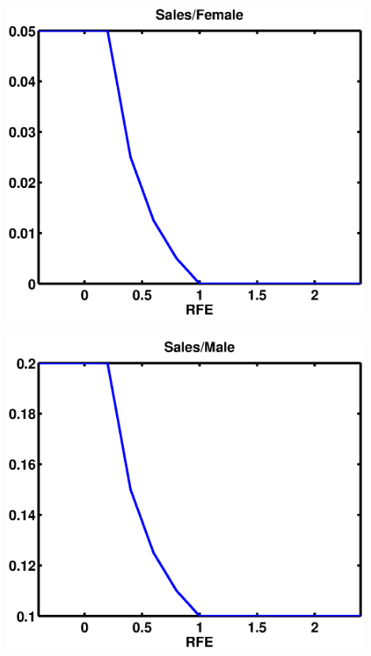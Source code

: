 \documentclass[mathserif]{beamer}
\begin{document}
\begin{frame}
\begin{center}
\frametitle{\insertsection}
\includegraphics[width=0.9\textwidth]{salefem}
\end{center}
\end{frame}

\begin{frame}
\begin{center}
\frametitle{\insertsection}
\includegraphics[width=0.9\textwidth]{salemale}
\end{center}
\end{frame}
\end{document}
